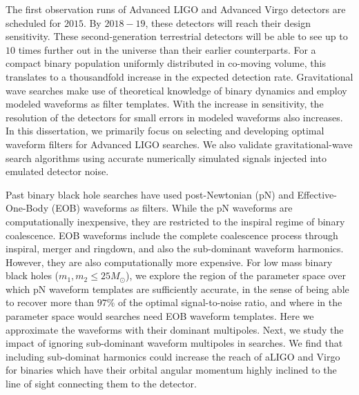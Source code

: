 

The first observation runs of Advanced LIGO and Advanced Virgo detectors 
are scheduled for $2015$. By $2018-19$, these detectors will reach 
their design sensitivity. These second-generation terrestrial detectors
will be able to see up to $10$ times further out in the universe 
than their earlier counterparts. For a compact binary population
uniformly distributed in co-moving volume, this translates to 
a thousandfold increase in the expected detection rate.
% 
Gravitational wave searches make use of theoretical knowledge of
binary dynamics and employ modeled waveforms as filter templates.
With the increase in sensitivity, the resolution of the detectors 
for small errors in modeled waveforms also increases. In this dissertation,
we primarily focus on selecting and developing optimal waveform filters
for Advanced LIGO searches. We also validate gravitational-wave 
search algorithms using accurate numerically simulated signals injected 
into emulated detector noise.

Past binary black hole searches have used post-Newtonian (pN) and 
Effective-One-Body (EOB) waveforms as filters. While the pN waveforms are 
computationally inexpensive, they are restricted to the inspiral
regime of binary coalescence. EOB waveforms include the complete
coalescence process through inspiral, merger and ringdown, and also
the sub-dominant waveform harmonics. However, they are also 
computationally more expensive. For low mass binary black holes 
($m_1,m_2\leq 25M_\odot$),
we explore the region of the parameter space over which pN waveform
templates are sufficiently accurate, in the sense of being able to 
recover more than $97\%$ of the optimal signal-to-noise ratio, 
and where in the parameter space would searches need EOB
waveform templates.
% 
Here we approximate the waveforms with their dominant multipoles. Next,
we study the impact of ignoring sub-dominant waveform multipoles in 
searches. We find that including sub-dominat harmonics could increase
the reach of aLIGO and Virgo for binaries which have their orbital
angular momentum highly inclined to the line of sight connecting them
to the detector.

